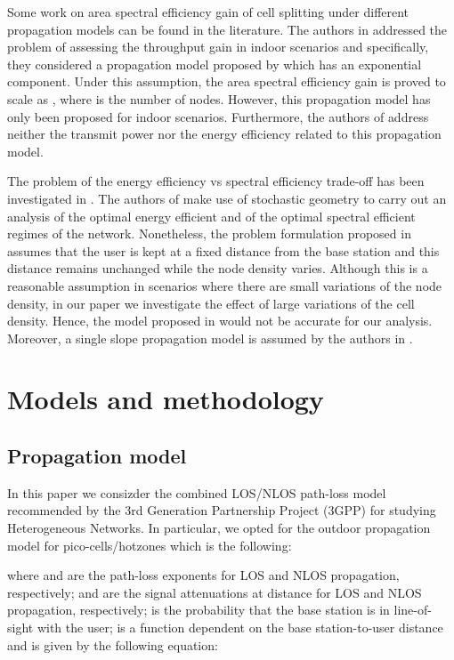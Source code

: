 \documentclass[twocoumn]{IEEEtran}
\begin{document}
Some work on area spectral efficiency gain of cell splitting under
different propagation models can be found in the literature. The authors
in \cite{Ling2012} addressed the problem of assessing the throughput
gain in indoor scenarios and specifically, they considered a propagation model proposed by \cite{Medbo2000}
which has an exponential component. Under this assumption, the area spectral efficiency gain is proved to scale as , where  is the number of nodes. However, this propagation model has only been proposed for indoor scenarios. Furthermore, the authors of \cite{Ling2012} address neither the transmit power nor the energy efficiency related to this propagation model.

The problem of the energy efficiency vs spectral efficiency trade-off
has been investigated in \cite{Rao2013}. The authors of \cite{Rao2013}
make use of stochastic geometry to carry out an analysis of the optimal
energy efficient and of the optimal spectral efficient regimes of the network.
Nonetheless, the problem formulation proposed in \cite{Rao2013}
assumes that the user is kept at a fixed distance from the base station
and this distance remains unchanged while the node density varies. Although this 
is a reasonable assumption in scenarios where there are small variations
of the node density, in our paper we investigate the effect of large
variations of the cell density. Hence, the model proposed in \cite{Rao2013}
would not be accurate for our analysis. Moreover, a single slope propagation model is assumed by the authors in \cite{Rao2013}.


\section{Models and methodology} \label{sec:systemModel}

\subsection{Propagation model}\label{subsec:propagationModel}

In this paper we consizder  the combined LOS/NLOS path-loss
model recommended by the 3rd Generation Partnership Project (3GPP)
for studying Heterogeneous Networks. In particular, we opted for
the outdoor propagation model for pico-cells/hotzones \cite{3GPP36814}
which is the following: 

where  and  are the path-loss exponents for LOS and NLOS propagation, respectively;  and  are the signal attenuations at distance   for LOS and NLOS propagation, respectively;  is the probability that the base station is in line-of-sight with the user;  is a function dependent on the base station-to-user distance   and is given by the following equation: 
\end{document}
